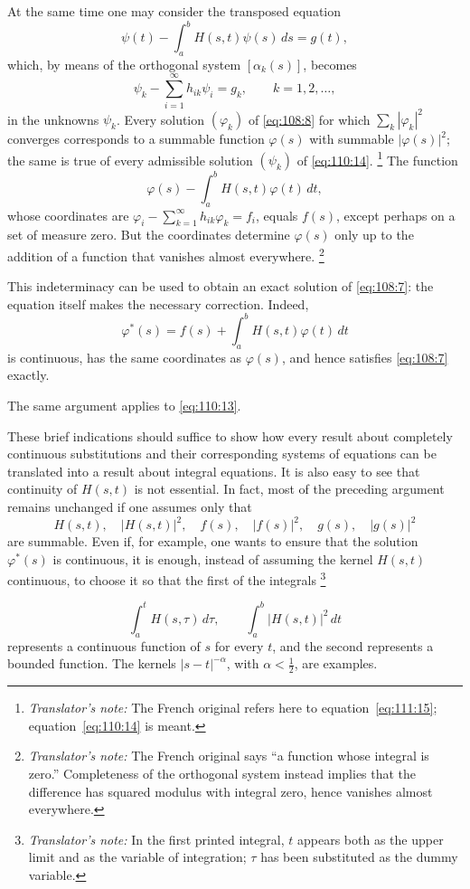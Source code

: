 \documentclass[
  paper=b5,
  fontsize=13pt,
  twoside=true,
  open=any,
  bookmarkpackage=false,
  chapterprefix=true,
  headings=normal
]{scrbook}
\theoremstyle{definition}
\newcounter{translatornote}
\newcommand{\translatornotelabel}{T\arabic{translatornote}}
\newcommand{\translatornote}[1]{%
  \stepcounter{translatornote}%
  \begingroup
    \edef\savedfootnotenumber{\number\value{footnote}}%
    \renewcommand{\thefootnote}{\translatornotelabel}%
    \footnote{\emph{Translator's note:} #1}%
    \setcounter{footnote}{\savedfootnotenumber}%
  \endgroup
}
\begin{document}
At the same time one may consider the transposed equation
\begin{equation}
  \psi(t)-\int_a^b H(s,t)\psi(s)\,ds=g(t),
  \tag{13}\label{eq:110:13}
\end{equation}
which, by means of the orthogonal system \([\alpha_k(s)]\), becomes
\begin{equation}
  \psi_k-\sum_{i=1}^{\infty}h_{ik}\psi_i=g_k,
  \qquad k=1,2,\ldots,
  \tag{14}\label{eq:110:14}
\end{equation}
in the unknowns \(\psi_k\).  Every solution \((\varphi_k)\) of
\eqref{eq:108:8} for which \(\sum_k|\varphi_k|^2\) converges corresponds to a
summable function \(\varphi(s)\) with summable \(|\varphi(s)|^2\); the same is
true of every admissible solution \((\psi_k)\) of \eqref{eq:110:14}.\translatornote{The French original refers here to equation~\eqref{eq:111:15}; equation~\eqref{eq:110:14} is meant.}  The
function
\[
  \varphi(s)-\int_a^bH(s,t)\varphi(t)\,dt,
\]
whose coordinates are
\(\varphi_i-\sum_{k=1}^{\infty}h_{ik}\varphi_k=f_i\), equals \(f(s)\), except
perhaps on a set of measure zero.  But the coordinates determine
\(\varphi(s)\) only up to the addition of a function that vanishes almost
everywhere.\translatornote{The French original says ``a function whose integral
is zero.''  Completeness of the orthogonal system instead implies that the
difference has squared modulus with integral zero, hence vanishes almost
everywhere.}
This indeterminacy can be used to obtain an exact solution of
\eqref{eq:108:7}: the equation itself makes the necessary correction.  Indeed,
\[
  \varphi^*(s)=f(s)+\int_a^bH(s,t)\varphi(t)\,dt
\]
is continuous, has the same coordinates as \(\varphi(s)\), and hence satisfies
\eqref{eq:108:7} exactly.

The same argument applies to \eqref{eq:110:13}.

These brief indications should suffice to show how every result about
completely continuous substitutions and their corresponding systems of
equations can be translated into a result about integral equations.  It is
also easy to see that continuity of \(H(s,t)\) is not essential.  In fact,
most of the preceding argument remains unchanged if one assumes only that
\[
  H(s,t),\quad |H(s,t)|^2,\quad f(s),\quad |f(s)|^2,
  \quad g(s),\quad |g(s)|^2
\]
are summable.  Even if, for example, one wants to ensure that the solution
\(\varphi^*(s)\) is continuous, it is enough, instead of assuming the kernel
\(H(s,t)\) continuous, to choose it so that the first of the
integrals\translatornote{In the first printed integral, \(t\) appears both as
the upper limit and as the variable of integration; \(\tau\) has been
substituted as the dummy variable.}
\[
  \int_a^tH(s,\tau)\,d\tau,
  \qquad
  \int_a^b|H(s,t)|^2\,dt
\]
represents a continuous function of \(s\) for every \(t\), and the second
represents a bounded function.  The kernels \(|s-t|^{-\alpha}\), with
\(\alpha<\tfrac12\), are examples.
\end{document}
